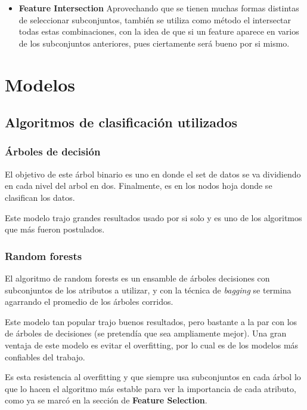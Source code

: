 \documentclass[a4paper]{article}
\begin{document}
\begin {itemize}
\begin{itemize}
	\item \textbf{Feature Intersection} Aprovechando que se tienen muchas formas distintas de seleccionar subconjuntos, también se utiliza como método el intersectar todas estas combinaciones, con la idea de que si un feature aparece en varios de los subconjuntos anteriores, pues ciertamente será bueno por si mismo.

\end{itemize}														

\end {itemize}


\section{Modelos}

\subsection{Algoritmos de clasificación utilizados}

\subsubsection{Árboles de decisión}

El objetivo de este árbol binario es uno en donde el set de datos se va dividiendo en cada nivel del arbol en dos. Finalmente, es en los nodos hoja donde se clasifican los datos.

Este modelo trajo grandes resultados usado por si solo y es uno de los algoritmos que más fueron postulados.

\subsubsection{Random forests}

El algoritmo de random forests es un ensamble de árboles decisiones con subconjuntos de los atributos a utilizar, y con la técnica de \textit{bagging} se termina agarrando el promedio de los árboles corridos.

Este modelo tan popular trajo buenos resultados, pero bastante a la par con los de árboles de decisiones (se pretendía que sea ampliamente mejor). Una gran ventaja de este modelo es evitar el overfitting, por lo cual es de los modelos más confiables del trabajo. 

Es esta resistencia al overfitting y que siempre usa subconjuntos en cada árbol lo que lo hacen el algoritmo más estable para ver la importancia de cada atributo, como ya se marcó en la sección de \textbf{Feature Selection}.
\end{document}
